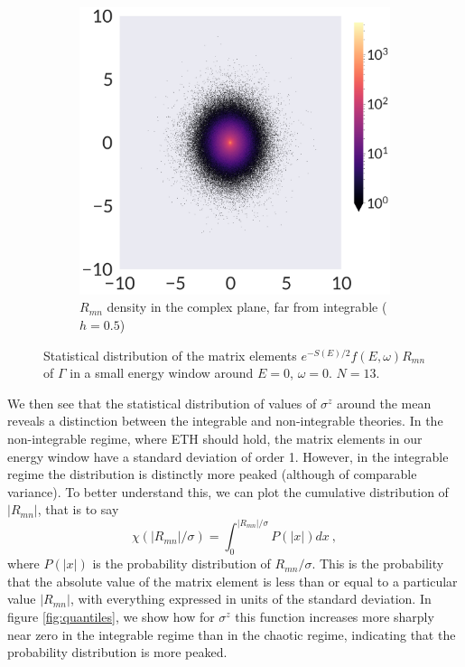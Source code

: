 \begin{figure}
\begin{subfigure}[b]{0.25\textwidth}
	\centering
\includegraphics[width=\columnwidth]{figures/chapter1/gamma05-2ddist-hist.png}
\caption{$R_{mn}$ density in the complex plane, far from integrable ($h=0.5$)}
\end{subfigure} 
\caption{Statistical distribution of the matrix elements $e^{-S(E)/2} f(E,\omega) R_{mn}$ of $\Gamma$ in a small energy window around $E=0$, $\omega=0$. $N=13$.}
\label{fig:stats-gamma}
\end{figure}

We then see that the statistical distribution of values of $\sigma^z$ around the mean reveals a distinction between the integrable and non-integrable theories. In the non-integrable regime, where ETH should hold, the matrix elements in our energy window have a standard deviation of order 1. However, in the integrable regime the distribution is distinctly more peaked (although of comparable variance). To better understand this, we can plot the cumulative distribution of $|R_{mn}|$, that is to say
\begin{equation}
\chi(|R_{mn}|/\sigma)=\int_0^{|R_{mn}|/\sigma} P(|x|) dx~, 
\end{equation}
where $P(|x|)$ is the probability distribution of $R_{mn}/\sigma$. This is the probability that the absolute value of the matrix element is less than or equal to a particular value $|R_{mn}|$, with everything expressed in units of the standard deviation. In figure \ref{fig:quantiles}, we show how for $\sigma^z$ this function increases more sharply near zero in the integrable regime than in the chaotic regime, indicating that the probability distribution is more peaked. 

